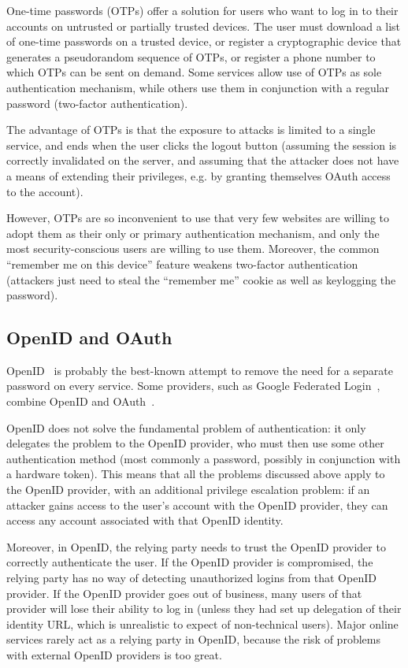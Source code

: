 One-time passwords (OTPs) offer a solution for users who want to log in to their accounts on
untrusted or partially trusted devices. The user must download a list of one-time passwords on a
trusted device, or register a cryptographic device that generates a pseudorandom sequence of OTPs,
or register a phone number to which OTPs can be sent on demand. Some services allow use of OTPs as
sole authentication mechanism, while others use them in conjunction with a regular password
(two-factor authentication).

The advantage of OTPs is that the exposure to attacks is limited to a single service, and ends when
the user clicks the logout button (assuming the session is correctly invalidated on the server, and
assuming that the attacker does not have a means of extending their privileges, e.g. by granting
themselves OAuth access to the account).

However, OTPs are so inconvenient to use that very few websites are willing to adopt them as their
only or primary authentication mechanism, and only the most security-conscious users are willing to
use them. Moreover, the common ``remember me on this device'' feature weakens two-factor
authentication (attackers just need to steal the ``remember me'' cookie as well as keylogging the
password).

\subsection{OpenID and OAuth}

OpenID~\cite{OpenID} is probably the best-known attempt to remove the need for a separate password
on every service. Some providers, such as Google Federated Login~\cite{GoogleOpenID}, combine OpenID
and OAuth~\cite{OAuth}.

OpenID does not solve the fundamental problem of authentication: it only delegates the problem to
the OpenID provider, who must then use some other authentication method (most commonly a password,
possibly in conjunction with a hardware token). This means that all the problems discussed above
apply to the OpenID provider, with an additional privilege escalation problem: if an attacker gains
access to the user's account with the OpenID provider, they can access any account associated with
that OpenID identity.

Moreover, in OpenID, the relying party needs to trust the OpenID provider to correctly authenticate
the user. If the OpenID provider is compromised, the relying party has no way of detecting
unauthorized logins from that OpenID provider. If the OpenID provider goes out of business, many
users of that provider will lose their ability to log in (unless they had set up delegation of their
identity URL, which is unrealistic to expect of non-technical users). Major online services rarely
act as a relying party in OpenID, because the risk of problems with external OpenID providers is too
great.

